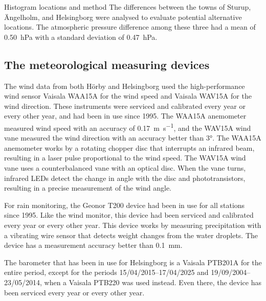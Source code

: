 Histogram locations and method
The differences between the towns of Sturup, Ängelholm, and Helsingborg were analysed to evaluate potential alternative locations. The atmospheric pressure difference among these three had a mean of \SI{0.50}{\hecto\pascal} with a standard deviation of \SI{0.47}{\hecto\pascal}.


\subsection{The meteorological measuring devices}
The wind data from both Hörby and Helsingborg used the high-performance wind sensor Vaisala WAA15A for the wind speed and Vaisala WAV15A for the wind direction. These instruments were serviced and calibrated every year or every other year, and had been in use since 1995. The WAA15A anemometer measured wind speed with an accuracy of \SI{0.17}{\m\per\s}, and the WAV15A wind vane measured the wind direction with an accuracy better than \ang{3}\cite{vaisalaWindSetWA152021}. The WAA15A anemometer works by a rotating chopper disc that interrupts an infrared beam, resulting in a laser pulse proportional to the wind speed. The WAV15A wind vane uses a counterbalanced vane with an optical disc. When the vane turns, infrared LEDs detect the change in angle with the disc and phototransistors, resulting in a precise measurement of the wind angle.

For rain monitoring, the Geonor T200 device had been in use for all stations since 1995. Like the wind monitor, this device had been serviced and calibrated every year or every other year. This device works by measuring precipitation with a vibrating wire sensor that detects weight changes from the water droplets\cite{geonorinc.T200BSeriesAll2019}. The device has a measurement accuracy better than \SI{0.1}{\mm}.

The barometer that has been in use for Helsingborg is a Vaisala PTB201A for the entire period, except for the periods 15/04/2015–17/04/2025 and 19/09/2004–23/05/2014, when a Vaisala PTB220 was used instead. Even there, the device has been serviced every year or every other year.